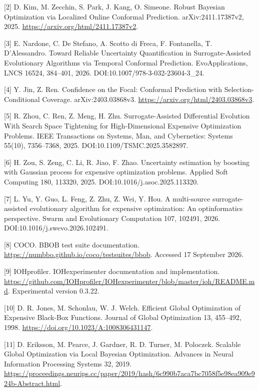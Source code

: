 \documentclass[11pt,a4paper]{article}
\begin{document}
{[}2{]} D. Kim, M. Zecchin, S. Park, J. Kang, O. Simeone. Robust
Bayesian Optimization via Localized Online Conformal Prediction.
arXiv:2411.17387v2, 2025. \url{https://arxiv.org/html/2411.17387v2}.

{[}3{]} E. Nardone, C. De Stefano, A. Scotto di Freca, F. Fontanella, T.
D'Alessandro. Toward Reliable Uncertainty Quantification in
Surrogate-Assisted Evolutionary Algorithms via Temporal Conformal
Prediction. EvoApplications, LNCS 16524, 384--401, 2026.
DOI:10.1007/978-3-032-23604-3\_24.

{[}4{]} Y. Jin, Z. Ren. Confidence on the Focal: Conformal Prediction
with Selection-Conditional Coverage. arXiv:2403.03868v3.
\url{https://arxiv.org/html/2403.03868v3}.

{[}5{]} R. Zhou, C. Ren, Z. Meng, H. Zhu. Surrogate-Assisted
Differential Evolution With Search Space Tightening for High-Dimensional
Expensive Optimization Problems. IEEE Transactions on Systems, Man, and
Cybernetics: Systems 55(10), 7356--7368, 2025.
DOI:10.1109/TSMC.2025.3582897.

{[}6{]} H. Zou, S. Zeng, C. Li, R. Jiao, F. Zhao. Uncertainty estimation
by boosting with Gaussian process for expensive optimization problems.
Applied Soft Computing 180, 113320, 2025.
DOI:10.1016/j.asoc.2025.113320.

{[}7{]} L. Yu, Y. Guo, L. Feng, Z. Zhu, Z. Wei, Y. Hou. A multi-source
surrogate-assisted evolutionary algorithm for expensive optimization: An
optinformatics perspective. Swarm and Evolutionary Computation 107,
102491, 2026. DOI:10.1016/j.swevo.2026.102491.

{[}8{]} COCO. BBOB test suite documentation.
\url{https://numbbo.github.io/coco/testsuites/bbob}. Accessed 17
September 2026.

{[}9{]} IOHprofiler. IOHexperimenter documentation and implementation.
\url{https://github.com/IOHprofiler/IOHexperimenter/blob/master/ioh/README.md}.
Experimental version 0.3.22.

{[}10{]} D. R. Jones, M. Schonlau, W. J. Welch. Efficient Global
Optimization of Expensive Black-Box Functions. Journal of Global
Optimization 13, 455--492, 1998.
\url{https://doi.org/10.1023/A:1008306431147}.

{[}11{]} D. Eriksson, M. Pearce, J. Gardner, R. D. Turner, M. Poloczek.
Scalable Global Optimization via Local Bayesian Optimization. Advances
in Neural Information Processing Systems 32, 2019.
\url{https://proceedings.neurips.cc/paper/2019/hash/6c990b7aca7bc7058f5e98ea909e924b-Abstract.html}.
\end{document}
